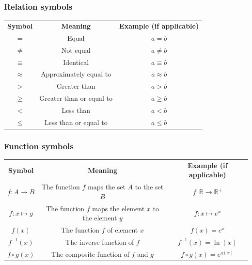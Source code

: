 \documentclass[12pt, a4paper, titlepage, twoside]{article}
\newcommand*{\R}{\mathbb{R}}
\begin{document}
	{\centering \subsubsection*{Relation symbols}}
	
	{\centering
		\begin{longtable}{|c|c|c|} 
 			\hline
			\textbf{Symbol} & \textbf{Meaning} & \textbf{Example (if applicable)}\\
			\hhline{|=|=|=|}
			$=$ & Equal & $a=b$\\
			\hline
			$\neq$ & Not equal & $a \neq b$\\
			\hline
			$\equiv$ & Identical & $a \equiv b$\\
			\hline
			$\approx$ & Approximately equal to & $a \approx b$\\
			\hline
			$>$ & Greater than & $a > b$\\
			\hline
			$\geqslant$ & Greater than or equal to & $a \geqslant b$\\
			\hline
			$<$ & Less than & $a < b$\\
			\hline
			$\leqslant$ & Less than or equal to & $a \leqslant b$\\
			\hline
		\end{longtable}}
	
	{\centering \subsubsection*{Function symbols}}
	
	{\centering
		\begin{longtable}{|c|c|c|} 
 			\hline
			\textbf{Symbol} & \textbf{Meaning} & \textbf{Example (if applicable)}\\
			\hhline{|=|=|=|}
			$f : A \to B$ & \makecell{The function $f$ maps\\ the set $A$ to the set $B$} & $f : \R \to \R^+$\\
			\hline
			$f : x \mapsto y$ & \makecell{The function $f$ maps\\ the element $x$ to the element $y$} & $f : x \mapsto e^x$\\
			\hline
			$f(x)$ & The function $f$ of element $x$ & $f(x) = e^x$\\
			\hline
			$f^{-1}(x)$ & The inverse function of $f$ & $f^{-1}(x) = \ln(x)$\\
			\hline
			$f \circ g(x)$ & The composite function of $f$ and $g$ & $f \circ g(x) = e^{g(x)}$\\
			\hline
		\end{longtable}}
	
\end{document}
